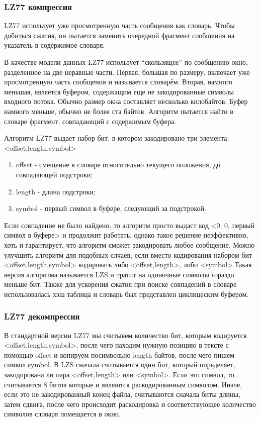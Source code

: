 \documentclass[12pt]{article}
\begin{document}
\subsubsection*{LZ77 компрессия}
LZ77 использует уже просмотренную часть сообщения как словарь. Чтобы добиться сжатия, он пытается заменить очередной фрагмент сообщения на указатель в содержимое словаря.

В качестве модели данных LZ77 использует “скользящее” по сообщению окно, разделенное на две неравные части. Первая, большая по размеру, включает уже просмотренную часть сообщения и называется словарём. Вторая, намного меньшая, является буфером, содержащим еще не закодированные символы входного потока. Обычно размер окна составляет несколько килобайтов. Буфер намного меньше, обычно не более ста байтов. Алгоритм пытается найти в словаре фрагмент, совпадающий с содержимым буфера.

Алгоритм LZ77 выдает набор бит, в котором закодировано три элемента:<offset,length,symbol>
\begin{enumerate}
    \item offset - смещение в словаре относительно текущего положения, до совпадающей подстроки;
    \item length - длина подстроки;
    \item symbol - первый символ в буфере, следующий за подстрокой.
\end{enumerate}
Если совпадение не было найдено, то алгоритм просто выдаст код <0, 0, первый символ в буфере> и продолжит работать, однако такое решение неэффективно, хоть и гарантирует, что алгоритм сможет закодировать любое сообщение.
Можно улучшить алгоритм для подобных слчаев, если вместо кодирования набором бит <offset,length,symbol> кодировать либо <offset,length>, либо <symbol>.Такая версия алгоритма называется LZS и тратит на одиночные символы гораздо меньше бит.
Также для ускорения сжатия при поиске совпадений в словаре использовалась хэш таблица и словарь был представлен циклицеским буфером.
\subsubsection*{LZ77 декомпрессия}
В стандартной версии LZ77 мы считывем количество бит, которым кодируется <offset,length,symbol>, после чего находим нужную позицию в тексте с помощью offset и копируем посимвольно length байтов, после чего пишем символ symbol.
В LZS сначала считывается один бит, который определяет, закодирована ли пара <offset,length> или <symbol>. Если это символ, то считывается 8 битов которые и являются раскодированным символом. Иначе, если это не закодированный конец файла, считываются сначала биты длины, затем сдвига, после чего происходит раскодировка и соответствующее количество символов словаря помещается в окно.
\end{document}

